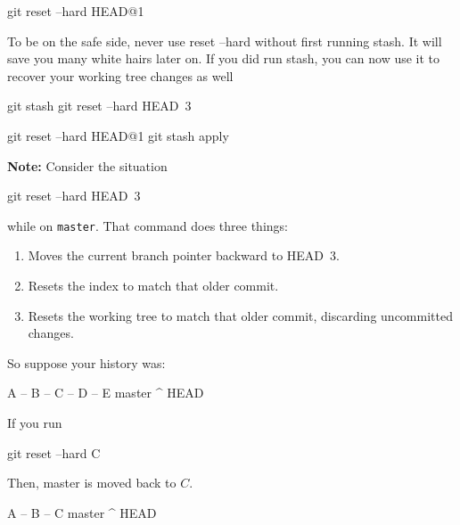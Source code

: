 \documentclass{report}
\begin{document}
\begin{itemize}
            \bigbreak \noindent 
            \begin{bashcode}
                git reset --hard HEAD@{1}
            \end{bashcode}
            \bigbreak \noindent 
            To be on the safe side, never use reset --hard without first running stash. It will save you many white hairs later on. If you did run stash, you can now use it to recover your working tree changes as well
            \bigbreak \noindent 
            \begin{bashcode}
                git stash 
                git reset --hard HEAD~3

                git reset --hard HEAD@{1}
                git stash apply
            \end{bashcode}
            \bigbreak \noindent 
            \textbf{Note:} Consider the situation 
            \bigbreak \noindent 
            \begin{bashcode}
                git reset --hard HEAD~3
            \end{bashcode}
            \bigbreak \noindent 
            while on \texttt{master}. That command does three things:
            \begin{enumerate}
                \item Moves the current branch pointer backward to HEAD~3.
                \item Resets the index to match that older commit.
                \item Resets the working tree to match that older commit, discarding uncommitted changes.
            \end{enumerate}
            So suppose your history was:
            \bigbreak \noindent 
            \begin{cppcode}
                A -- B -- C -- D -- E   master
                ^
                HEAD
            \end{cppcode}
            \bigbreak \noindent 
            If you run 
            \bigbreak \noindent 
            \begin{bashcode}
                git reset --hard C 
            \end{bashcode}
            \bigbreak \noindent 
            Then, master is moved back to $C$.
            \bigbreak \noindent 
            \begin{cppcode}
                A -- B -- C   master
                ^
                HEAD


\end{cppcode}
\end{itemize}
\end{document}
